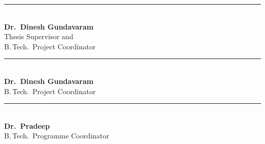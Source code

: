\vspace{2.0cm}
\noindent\begin{minipage}[t]{0.45\textwidth}
\centering
\rule{6cm}{0.4pt}\\[2pt]
\textbf{Dr.\ Dinesh Gundavaram}\\
Thesis Supervisor and \\
B.\,Tech.\ Project Coordinator
\end{minipage}\hfill
\begin{minipage}[t]{0.45\textwidth}
\centering
\rule{6cm}{0.4pt}\\[2pt]
\textbf{Dr.\ Dinesh Gundavaram}\\
B.\,Tech.\ Project Coordinator
\end{minipage}

\vspace{1.5cm}
\noindent\begin{center}
\rule{6cm}{0.4pt}\\[2pt]
\textbf{Dr.\ Pradeep}\\
B.\,Tech.\ Programme Coordinator
\end{center}
